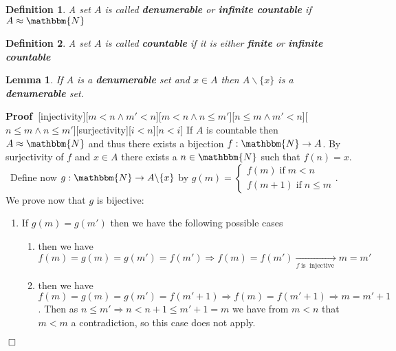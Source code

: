 \documentclass{book}
\newcommand{\Rightarrowlim}{\mathop{\rightarrow}\limits}
\newcommand{\tmop}[1]{\ensuremath{\operatorname{#1}}}
\newcommand{\tmtextbf}[1]{{\bfseries{#1}}}
\newcommand{\upl}{+}
\newenvironment{proof}{\noindent\textbf{Proof\ }}{\hspace*{\fill}$\Box$\medskip}
\newtheorem{definition}{Definition}
{\theorembodyfont{\rmfamily}\newtheorem{example}{Example}}
\newtheorem{lemma}{Lemma}
\begin{document}
{{\begin{definition}
  \label{countable sets}{}{}A set $A$ is called \tmtextbf{denumerable} or \tmtextbf{infinite
  countable} if $A \approx \mathbbm{N}$
\end{definition}

\begin{definition}
  {}A set $A$ is called \tmtextbf{countable} if it is
  either \tmtextbf{finite} or \tmtextbf{infinite countable}
\end{definition}

\begin{lemma}
  \label{countable set minus one element is countable}If $A$ is a
  \tmtextbf{denumerable} set and $x \in A$ then $A \backslash \{ x \}$ is a
  \tmtextbf{denumerable} set.
\end{lemma}

\begin{proof}[injectivity][$m < n \wedge m' < n$][$m < n \wedge n \leqslant
m'$][$n \leqslant m \wedge m' < n$][$n \leqslant m \wedge n \leqslant
m'$][surjectivity][$i < n$][$n < i$]
  If $A$ is countable then $A \approx \mathbbm{N}$ and thus there exists a
  bijection $f : \mathbbm{N} \rightarrow A$. By surjectivity of $f$ and $x \in
  A$ there exists a $n \in \mathbbm{N}$ such that $f (n) = x$. \ Define now $g
  : \mathbbm{N} \rightarrow A\backslash \{ x \}$ by $g (m) = \left\{
  \begin{array}{l}
    f (m) \tmop{if} m < n\\
    f (m \upl 1) \tmop{if} n \leqslant m
  \end{array} \right.$. We prove now that $g$ is bijective:
  \begin{enumerate}
    \item If $g (m) = g (m')$ then we have the following possible cases
    \begin{enumerate}
      \item then we have $f (m) = g (m) = g (m') = f (m') \Rightarrow f (m) =
      f (m') \Rightarrowlim_{f \tmop{is} \tmop{injective}} m = m'$
      
      \item then we have $f (m) = g (m) = g (m') = f (m' \upl 1) \Rightarrow f
      (m) = f (m' \upl 1) \Rightarrow m = m' \upl 1$. Then as $n \leqslant m'
      \Rightarrow n < n \upl 1 \leqslant m' \upl 1 = m$ we have from $m < n$
      that $m < m$ a contradiction, so this case does not apply.
      

\end{enumerate}
\end{enumerate}
\end{proof}}}
\end{document}
